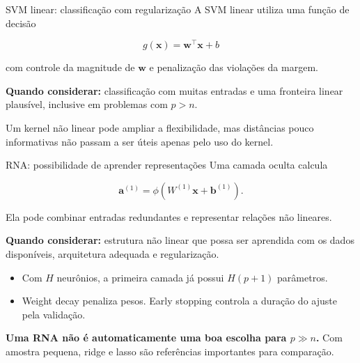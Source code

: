 \documentclass[
  10pt,
  ignorenonframetext,
  aspectratio=169,
  brazilian,
]{beamer}
\providecommand{\tightlist}{%
  \setlength{\itemsep}{0pt}\setlength{\parskip}{0pt}}
\begin{document}
\begin{frame}{SVM linear: classificação com regularização}
\protect{}\label{svm-linear-classificauxe7uxe3o-com-regularizauxe7uxe3o}
A SVM linear utiliza uma função de decisão

\[
g(\mathbf x)=\mathbf w^\top\mathbf x+b
\]

com controle da magnitude de \(\mathbf w\) e penalização das violações
da margem.

\textbf{Quando considerar:} classificação com muitas entradas e uma
fronteira linear plausível, inclusive em problemas com \(p>n\).

Um kernel não linear pode ampliar a flexibilidade, mas distâncias pouco
informativas não passam a ser úteis apenas pelo uso do kernel.
\end{frame}

\begin{frame}{RNA: possibilidade de aprender representações}
\protect{}\label{rna-possibilidade-de-aprender-representauxe7uxf5es}
Uma camada oculta calcula

\[
\mathbf a^{(1)}=\phi(W^{(1)}\mathbf x+\mathbf b^{(1)}).
\]

Ela pode combinar entradas redundantes e representar relações não
lineares.

\textbf{Quando considerar:} estrutura não linear que possa ser aprendida
com os dados disponíveis, arquitetura adequada e regularização.

\begin{itemize}
\tightlist
\item
  Com \(H\) neurônios, a primeira camada já possui \(H(p+1)\)
  parâmetros.
\item
  Weight decay penaliza pesos. Early stopping controla a duração do
  ajuste pela validação.
\end{itemize}

\textbf{Uma RNA não é automaticamente uma boa escolha para \(p\gg n\).}
Com amostra pequena, ridge e lasso são referências importantes para
comparação.
\end{frame}
\end{document}
